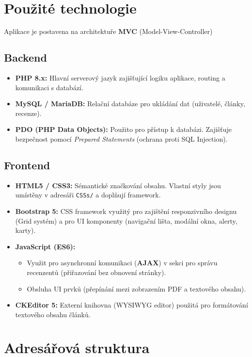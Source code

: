 \documentclass[12pt,a4paper]{article}
\begin{document}
\section{Použité technologie}

Aplikace je postavena na architektuře \textbf{MVC} (Model-View-Controller) 
\subsection{Backend}
\begin{itemize}
    \item \textbf{PHP 8.x:} Hlavní serverový jazyk zajišťující logiku aplikace, routing a komunikaci s databází.
    \item \textbf{MySQL / MariaDB:} Relační databáze pro ukládání dat (uživatelé, články, recenze).
    \item \textbf{PDO (PHP Data Objects):} Použito pro přístup k databázi. Zajišťuje bezpečnost pomocí \textit{Prepared Statements} (ochrana proti SQL Injection).
\end{itemize}

\subsection{Frontend}
\begin{itemize}
    \item \textbf{HTML5 / CSS3:} Sémantické značkování obsahu. Vlastní styly jsou umístěny v adresáři \texttt{CSSs/} a doplňují framework.
    \item \textbf{Bootstrap 5:} CSS framework využitý pro zajištění responzivního designu (Grid systém) a pro UI komponenty (navigační lišta, modální okna, alerty, karty).
    \item \textbf{JavaScript (ES6):}
    \begin{itemize}
        \item Využit pro asynchronní komunikaci (\textbf{AJAX}) v sekci pro správu recenzentů (přiřazování bez obnovení stránky).
        \item Obsluha UI prvků (přepínání mezi zobrazením PDF a textového obsahu).
    \end{itemize}
    \item \textbf{CKEditor 5:} Externí knihovna (WYSIWYG editor) použitá pro formátování textového obsahu článků.
\end{itemize}

\section{Adresářová struktura}
\end{document}
